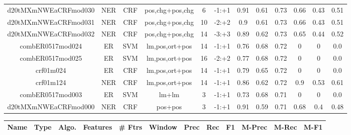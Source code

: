 \documentclass[a4paper]{article}
\begin{document}
\begin{landscape}
\begin{center}
\begin{tabular}{ |c|c|c|c|c|c|c|c|c|c|c|c|}
 
 	
 	\small{ d20tMXmNWEaCRFmod030 } & NER & CRF & pos,chg+pos,chg  &  6 &  -1:+1  &  0.91 & 0.61 & 0.73  &  0.66 & 0.43 & 0.51 \\
 	

 
 	
 	\small{ d20tMXmNWEaCRFmod031 } & NER & CRF & pos,chg+pos,chg  &  10 &  -2:+2  &  0.9 & 0.61 & 0.73  &  0.66 & 0.43 & 0.51 \\
 	

 
 	
 	\small{ d20tMXmNWEaCRFmod032 } & NER & CRF & pos,chg+pos,chg  &  14 &  -3:+3  &  0.89 & 0.62 & 0.73  &  0.65 & 0.44 & 0.52 \\
 	

 
 	
 	\small{ combER0517mod024 } & ER & SVM & lm,pos,ort+pos  &  14 &  -1:+1  &  0.76 & 0.68 & 0.72  &  0 & 0 & 0.0 \\
 	

 
 	
 	\small{ combER0517mod025 } & ER & SVM & lm,pos,ort+pos  &  16 &  -2:+2  &  0.77 & 0.68 & 0.72  &  0 & 0 & 0.0 \\
 	

 
 	
 	\small{ crf01m024 } & ER & CRF & lm,pos,ort+pos  &  14 &  -1:+1  &  0.79 & 0.65 & 0.72  &  0 & 0 & 0.0 \\
 	

 
 	
 	\small{ crf01m124 } & NER & CRF & lm,pos,ort+pos  &  14 &  -1:+1  &  0.86 & 0.62 & 0.72  &  0.9 & 0.53 & 0.61 \\
 	

 
 	
 	\small{ combER0517mod003 } & ER & SVM & lm+lm  &  3 &  -1:+1  &  0.73 & 0.68 & 0.71  &  0 & 0 & 0.0 \\
 	

 
 	
 	\small{ d20tMXmNWEaCRFmod000 } & NER & CRF & pos+pos  &  3 &  -1:+1  &  0.91 & 0.59 & 0.71  &  0.68 & 0.4 & 0.48 \\
 	
 \hline
\end{tabular}
\end{center}




\begin{center}
\begin{tabular}{ |c|c|c|c|c|c|c|c|c|c|c|c|} 
 \hline
 	Name & Type & Algo. & Features & \# Ftrs & Window & Prec & Rec & F1 & M-Prec & M-Rec & M-F1\\
 \hline


\end{tabular}
\end{center}
\end{landscape}
\end{document}
